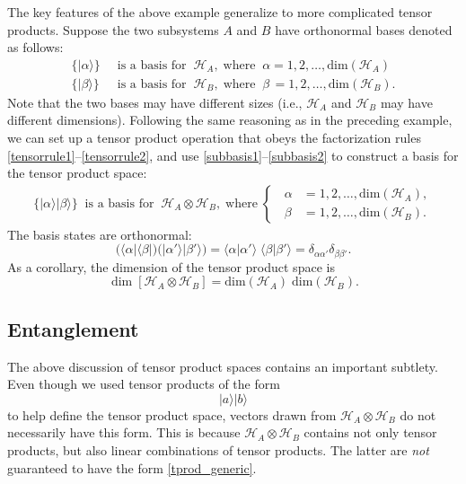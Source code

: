 \documentclass[pra,12pt]{revtex4-2}
\begin{document}
The key features of the above example generalize to more complicated
tensor products.  Suppose the two subsystems $A$ and $B$ have
orthonormal bases denoted as follows:
\begin{align}
  \Big\{ |\alpha\rangle \Big\} &\;\;\textrm{is a basis for}\;\; \mathscr{H}_A,
  \;\mathrm{where}\;\; \alpha = 1, 2, \dots, \mathrm{dim}(\mathscr{H}_A)
  \label{subbasis1} \\
  \Big\{ |\beta\rangle \Big\} &\;\; \textrm{is a basis for}\;\; \mathscr{H}_B,
  \;\mathrm{where}\;\; \beta\, = 1, 2, \dots, \mathrm{dim}(\mathscr{H}_B).
  \label{subbasis2}
\end{align}
Note that the two bases may have different sizes (i.e.,
$\mathscr{H}_A$ and $\mathscr{H}_B$ may have different dimensions).
Following the same reasoning as in the preceding example, we can set
up a tensor product operation that obeys the factorization rules
\eqref{tensorrule1}--\eqref{tensorrule2}, and use
\eqref{subbasis1}--\eqref{subbasis2} to construct a basis for the
tensor product space:
\begin{align}
  \Big\{ |\alpha \rangle |\beta \rangle \Big\}
  \;\;\textrm{is a basis for}\;\; \mathscr{H}_A \otimes \mathscr{H}_B,
  \;\mathrm{where}\;
  \begin{cases}
    \;\;\alpha \!\!\!\!&= 1, 2, \dots, \mathrm{dim}(\mathscr{H}_A), \\
    \;\;\beta \!\!\!\!\!&= 1, 2, \dots, \mathrm{dim}(\mathscr{H}_B).
  \end{cases}
\end{align}
The basis states are orthonormal:
\begin{equation}
  \Big(\langle \alpha| \langle \beta|\Big)
  \Big(|\alpha'\rangle |\beta'\rangle\Big)
  = \langle \alpha|\alpha'\rangle \; \langle \beta|\beta'\rangle
  = \delta_{\alpha\alpha'} \delta_{\beta\beta'}.
  \label{innerprod}
\end{equation}
As a corollary, the dimension of the tensor product space is
\begin{equation}
  \dim\left[\mathscr{H}_A \otimes \mathscr{H}_B\right]
  = \mathrm{dim}(\mathscr{H}_A)\; \mathrm{dim}(\mathscr{H}_B).
  \label{tensordim}
\end{equation}

\subsection{Entanglement}
\label{sec:entanglement}

The above discussion of tensor product spaces contains an important
subtlety.  Even though we used tensor products of the form
\begin{equation}
  |a\rangle |b\rangle
  \label{tprod_generic}
\end{equation}
to help define the tensor product space, vectors drawn from
$\mathscr{H}_A \otimes \mathscr{H}_B$ do not necessarily have this
form.  This is because $\mathscr{H}_A \otimes \mathscr{H}_B$ contains
not only tensor products, but also linear combinations of tensor
products.  The latter are \textit{not} guaranteed to have the form
\eqref{tprod_generic}.
\end{document}
